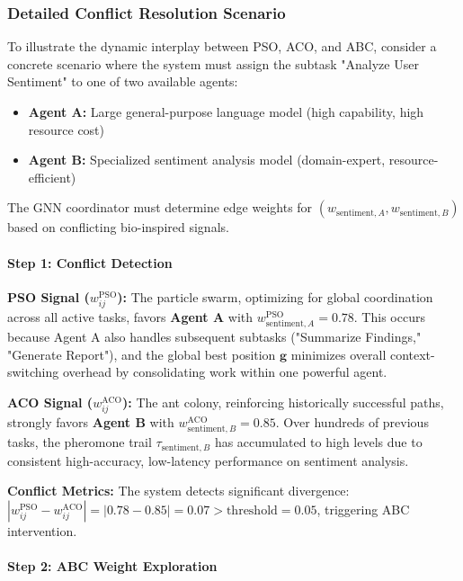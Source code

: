 \documentclass{article}
\begin{document}
\subsubsection{Detailed Conflict Resolution Scenario}
\label{subsubsec:conflict_scenario}

To illustrate the dynamic interplay between PSO, ACO, and ABC, consider a concrete scenario where the system must assign the subtask "Analyze User Sentiment" to one of two available agents:

\begin{itemize}
\item \textbf{Agent A:} Large general-purpose language model (high capability, high resource cost)
\item \textbf{Agent B:} Specialized sentiment analysis model (domain-expert, resource-efficient)
\end{itemize}

The GNN coordinator must determine edge weights for $(w_{\text{sentiment},A}, w_{\text{sentiment},B})$ based on conflicting bio-inspired signals.

\paragraph{Step 1: Conflict Detection}

\textbf{PSO Signal ($w_{ij}^{\text{PSO}}$):} The particle swarm, optimizing for global coordination across all active tasks, favors \textbf{Agent A} with $w_{\text{sentiment},A}^{\text{PSO}} = 0.78$. This occurs because Agent A also handles subsequent subtasks ("Summarize Findings," "Generate Report"), and the global best position $\mathbf{g}$ minimizes overall context-switching overhead by consolidating work within one powerful agent.

\textbf{ACO Signal ($w_{ij}^{\text{ACO}}$):} The ant colony, reinforcing historically successful paths, strongly favors \textbf{Agent B} with $w_{\text{sentiment},B}^{\text{ACO}} = 0.85$. Over hundreds of previous tasks, the pheromone trail $\tau_{\text{sentiment},B}$ has accumulated to high levels due to consistent high-accuracy, low-latency performance on sentiment analysis.

\textbf{Conflict Metrics:} The system detects significant divergence: $|w_{ij}^{\text{PSO}} - w_{ij}^{\text{ACO}}| = |0.78 - 0.85| = 0.07 > \text{threshold} = 0.05$, triggering ABC intervention.

\paragraph{Step 2: ABC Weight Exploration}
\end{document}
